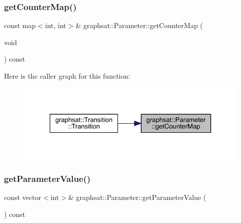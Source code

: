 \subsubsection{\texorpdfstring{getCounterMap()}{getCounterMap()}}
{\footnotesize\ttfamily const map$<$int, int$>$\& graphsat\+::\+Parameter\+::get\+Counter\+Map (\begin{DoxyParamCaption}\item[{void}]{ }\end{DoxyParamCaption}) const\hspace{0.3cm}{\ttfamily [inline]}}

Here is the caller graph for this function\+:
\nopagebreak
\begin{figure}[H]
\begin{center}
\leavevmode
\includegraphics[width=327pt]{classgraphsat_1_1_parameter_a452bc578f7adf8feaedd40f3aa06fab9_icgraph}
\end{center}
\end{figure}
\mbox{\label{classgraphsat_1_1_parameter_a9f6ef8090aefb3f53ca031b70a9c81c4}} 
\subsubsection{\texorpdfstring{getParameterValue()}{getParameterValue()}}
{\footnotesize\ttfamily const vector$<$int$>$\& graphsat\+::\+Parameter\+::get\+Parameter\+Value (\begin{DoxyParamCaption}{ }\end{DoxyParamCaption}) const\hspace{0.3cm}{\ttfamily [inline]}}


